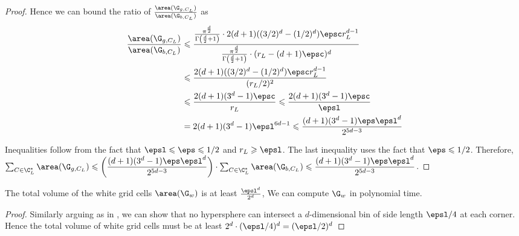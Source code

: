 \begin{proof}
		Hence we can bound the ratio of \(\frac{\area(\G_{g, C_L})}{\area(\G_{b, C_L})}\) as
		\[
		\begin{aligned}
		\frac{\area(\G_{g, C_L})}{\area(\G_{b, C_L})} &\leqslant \frac{\frac{\pi^{\frac{d}{2}}}{\Gamma\left(\frac{d}{2} + 1\right)} \cdot 2(d+1)((3/2)^d-(1/2)^d)\epsc r_{L}^{d-1}}{\frac{\pi^{\frac{d}{2}}}{\Gamma\left(\frac{d}{2} + 1\right)} \cdot (r_L-(d+1)\epsc)^d} \\
		&\leqslant \frac{2(d+1)((3/2)^d-(1/2)^d)\epsc r_{L}^{d-1}}{(r_L/2)^2} \\
		&\leqslant \frac{2(d+1)(3^d-1)\epsc}{r_L} \leqslant \frac{2(d+1)(3^d-1)\epsc}{\epsl} \\
		&= 2(d+1)(3^d-1)\epsl^{6d-1} \leqslant \frac{(d+1)(3^d-1)\eps\epsl^d}{2^{5d-3}}
		\end{aligned}
		\]
		
		Inequalities follow from the fact that $\epsl \leqslant \eps \leqslant 1/2$ and $r_L \geqslant \epsl$.  The last inequality uses the fact that $\eps \leqslant 1/2$.
		Therefore, $\sum_{C \in \C_{L}^{*}} {\area(\G_{g, C_L})} \leqslant \bigg(\dfrac{(d+1)(3^d-1)\eps\epsl^d}{2^{5d-3}}\bigg) \cdot \sum_{C \in \C_{L}^{*}}  {\area(\G_{b, C_L})} \leqslant \dfrac{(d+1)(3^d-1)\eps\epsl^d}{2^{5d-3}}$.
	\end{proof}
	\begin{lem}\label{lem:white-circles-d}
		The total volume of the white grid cells \(\area(\G_w)\) is at least \(\frac{\epsl^d}{2^d}\), We can compute \(\G_w\) in polynomial time.
	\end{lem}
	\begin{proof}
		Similarly arguing as in , we can show that no hypersphere can intersect a $d$-dimensional bin of side length \(\epsl/4\) at each corner. Hence the total volume of white grid cells must be at least \(2^d\cdot(\epsl/4)^d=(\epsl/2)^d\)
	\end{proof}
	
